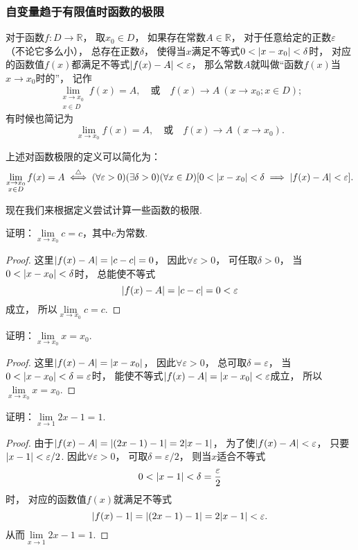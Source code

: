 \subsubsection*{自变量趋于有限值时函数的极限}
\begin{definition}\label{definition:极限.函数极限的定义1}
对于函数\(f\colon D\to\mathbb{R}\)，
取\(x_0 \in D\)，
如果存在常数\(A\in\mathbb{R}\)，
对于任意给定的正数\(\varepsilon\)（不论它多么小），
总存在正数\(\delta\)，
使得当\(x\)满足不等式\(0 < \abs{x-x_0} < \delta\)时，
对应的函数值\(f(x)\)都满足不等式\(\abs{f(x)-A}<\varepsilon\)，
那么常数\(A\)就叫做“函数\(f(x)\)当\(x \to x_0\)时的”，
记作
\[
	\lim\limits_{\substack{x \to x_0 \\ x \in D}} f(x) = A,
	\quad\text{或}\quad
	f(x) \to A\ (x \to x_0; x \in D);
\]
有时候也简记为
\[
	\lim\limits_{x \to x_0} f(x) = A,
	\quad\text{或}\quad
	f(x) \to A\ (x \to x_0).
\]
\end{definition}

上述对函数极限的定义可以简化为：
\[
	\lim\limits_{\substack{x \to x_0 \\ x \in D}} f(x) = A
	\overset{\triangle}{\iff}
	(\forall \varepsilon > 0)
	(\exists \delta > 0)
	(\forall x \in D)
	[0 < \abs{x - x_0} < \delta \implies \abs{f(x) - A} < \varepsilon].
\]

现在我们来根据定义尝试计算一些函数的极限.
\begin{example}
证明：\(\lim\limits_{x \to x_0} c = c\)，其中\(c\)为常数.
\begin{proof}
这里\(\abs{f(x) - A} = \abs{c - c} = 0\)，
因此\(\forall \varepsilon > 0\)，
可任取\(\delta > 0\)，
当\(0 < \abs{x - x_0} < \delta\)时，
总能使不等式\[
	\abs{f(x) - A} = \abs{c - c} = 0 < \varepsilon
\]成立，
所以\(\lim\limits_{x \to x_0} c = c\).
\end{proof}
\end{example}

\begin{example}
证明：\(\lim\limits_{x \to x_0} x = x_0\).
\begin{proof}
这里\(\abs{f(x) - A} = \abs{x - x_0}\)，
因此\(\forall \varepsilon > 0\)，
总可取\(\delta = \varepsilon\)，
当\(0 < \abs{x - x_0} < \delta = \varepsilon\)时，
能使不等式\(\abs{f(x) - A} = \abs{x - x_0} < \varepsilon\)成立，
所以\(\lim\limits_{x \to x_0} x = x_0\).
\end{proof}
\end{example}

\begin{example}
证明：\(\lim\limits_{x\to1} 2x-1 = 1\).
\begin{proof}
由于\(\abs{f(x) - A} = \abs{(2x-1) - 1} = 2\abs{x-1}\)，
为了使\(\abs{f(x) - A} < \varepsilon\)，
只要\(\abs{x-1}<\varepsilon/2\).
因此\(\forall \varepsilon > 0\)，
可取\(\delta = \varepsilon/2\)，
则当\(x\)适合不等式\[
	0 < \abs{x-1} < \delta = \frac{\varepsilon}{2}
\]时，
对应的函数值\(f(x)\)就满足不等式\[
	\abs{f(x) - 1} = \abs{(2x-1) - 1} = 2\abs{x-1} < \varepsilon.
\]
从而\(\lim\limits_{x\to1} 2x-1 = 1\).
\end{proof}
\end{example}

